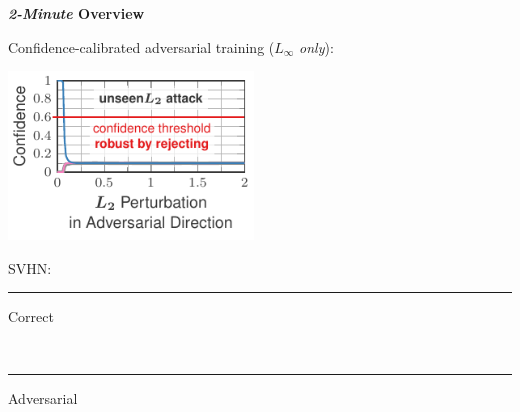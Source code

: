\documentclass[64pt]{beamer}
\begin{document}
	\begin{frame}[t]{\bfseries \textit{2-Minute} Overview}
		\Large
		
	    Confidence-calibrated adversarial training ($L_\infty$ \emph{only}):
		
		\vskip -0.25cm
		\begin{minipage}[t]{0.7\textwidth}
			\vspace*{0px}
			\hfill
			\includegraphics[width=6.5cm]{fig/introduction/ours10_3_l2_adversarial_annotated}
		\end{minipage}
		\hfill
		\begin{minipage}[t]{0.28\textwidth}
			\vspace*{4px}
			
			\begin{tcolorbox}[
				left=0pt,
				right=0pt,
				top=0pt,
				bottom=0pt,
				colback=gray!12!white,
				colframe=gray!12!white,
				width=1\textwidth, 
				enlarge left by=0mm,
				boxsep=5pt,
				arc=0pt,outer arc=0pt,
				boxrule=1pt,
				]
				\large
				SVHN:\\
				\textcolor{colorbrewer2}{{\rule[4pt]{10pt}{2pt} Correct}}\\ \textcolor{colorbrewer8}{{\rule[4pt]{10pt}{2pt} Adversarial}}
			\end{tcolorbox}
		\end{minipage}
	\end{frame}

%		
%		
\end{document}

